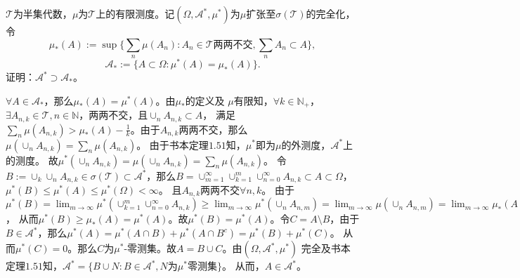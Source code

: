 \documentclass{ctexart}
\begin{document}
\begin{problem}\label{pro:22}
  \(\mathcal{T} \)为半集代数，\(\mu \)为\(\mathcal{T} \)上的有限测度。记\((\Omega,\mathcal{A}^*,\mu^*) \)为\(\mu \)扩张至\(\sigma(\mathcal{T}) \)的完全化，令 
  \[
    \mu_*(A):=\sup \{\sum_{n}\mu(A_n):A_n \in \mathcal{T} \text{两两不交},\sum_{n}A_n \subset A\},
  \]
  \[
    \mathcal{A}_*:=\{A \subset \Omega:\mu^*(A)=\mu_*(A)\}.
  \]
  证明：\(\mathcal{A}^* \supset \mathcal{A}_* \)。
\end{problem}
\begin{solution}
  \(\forall A \in \mathcal{A}_* \)，那么\(\mu_*(A)=\mu^*(A) \)。由\(\mu_* \)的定义及 \(\mu \)有限知，\(\forall k \in \mathbb{N}_{+} \)，\(\exists A_{n,k} \in \mathcal{T} , n \in \mathbb{N}\)，两两不交，且\(\cup_n A_{n,k} \subset A \)，
  满足\(\sum_{n}\mu(A_{n,k}) > \mu_*(A)-\frac{1}{k} \)。由于\(A_{n,k} \)两两不交，那么\(\mu(\cup_n A_{n,k})=\sum_{n}\mu(A_{n,k}) \)。
  由于书本定理\(1.51 \)知，\(\mu^* \)即为\(\mu \)的外测度，\(\mathcal{A}^* \)上的测度。
  故\(\mu^*(\cup_n A_{n,k})=\mu(\cup_n A_{n,k})=\sum_{n}\mu(A_{n,k}) \)。
  令\(B:= \cup_k \cup_n A_{n,k} \in \sigma(\mathcal{T}) \subset \mathcal{A}^*\)，那么\(B= \cup_{m=1}^{\infty} \cup_{k=1}^{m} \cup_{n=0}^{\infty}A_{n,k} \subset A \subset \Omega\)，\(\mu^*(B) \leq \mu^*(A) \leq \mu^*(\Omega)<\infty \)。
  且\(A_{n,k} \)两两不交\(\forall n,k \)。
  由于\(\mu^*(B)=\lim_{m \to \infty }\mu^*(\cup_{k=1}^m \cup_{n=0}^{\infty}A_{n,k}) \geq \lim_{m \to \infty} \mu^*(\cup_n A_{n,m})=\lim_{m \to \infty}\mu(\cup_n A_{n,m})=\lim_{m \to \infty} \mu_*(A)-\frac{1}{m}=\mu_*(A)\)，
  从而\(\mu^*(B) \geq \mu_*(A)=\mu^*(A) \)。故\(\mu^*(B)=\mu^*(A) \)。令\(C=A\setminus B \)，由于\(B \in \mathcal{A}^* \)，那么\(\mu^*(A)=\mu^*(A \cap B) + \mu^*(A \cap B^c)=\mu^*(B) + \mu^*(C) \)。
  从而\(\mu^*(C)=0 \)。那么\(C \)为\(\mu^* \)-零测集。故\(A=B \cup C \)。由\((\Omega,\mathcal{A}^*,\mu^*) \) 完全及书本定理\(1.51 \)知，\(\mathcal{A}^*=\{B \cup N: B \in \mathcal{A}^*,N \text{为}\mu^* \text{零测集} \} \)。
  从而，\(A \in \mathcal{A}^* \)。

\end{solution}
\end{document}
